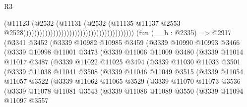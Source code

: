 \begin{lexlean}{R3}
\begin{coremodule}
                                                                            (@11123
                                                                              (@2532
                                                                                (@11131
                                                                                  (@2532
                                                                                    (@11135
                                                                                      @11137
                                                                                      @2553
                                                                                      @2528)))))))))))))))))))))))))))))))))))))))))
    (fun (__b : @2335) =>
    @2917
      (@3341
        @3452
        (@3339
          @10982
          @10985
          @3459
          (@3339
            @10990
            @10993
            @3466
            (@3339
              @10998
              @11001
              @3473
              (@3339
                @11006
                @11009
                @3480
                (@3339
                  @11014
                  @11017
                  @3487
                  (@3339
                    @11022
                    @11025
                    @3494
                    (@3339
                      @11030
                      @11033
                      @3501
                      (@3339
                        @11038
                        @11041
                        @3508
                        (@3339
                          @11046
                          @11049
                          @3515
                          (@3339
                            @11054
                            @11057
                            @3522
                            (@3339
                              @11062
                              @11065
                              @3529
                              (@3339
                                @11070
                                @11073
                                @3536
                                (@3339
                                  @11078
                                  @11081
                                  @3543
                                  (@3339
                                    @11086
                                    @11089
                                    @3550
                                    (@3339
                                      @11094
                                      @11097
                                      @3557

\end{coremodule}
\end{lexlean}
